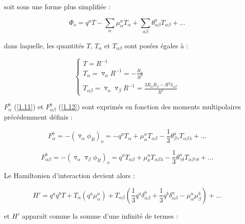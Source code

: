 	soit sous une forme plus simplifiée : 
	
	\begin{equation}
	\Phi_{o} = q^{a} T - \sum_{\alpha} \mu_{\alpha}^{a} T_{\alpha} + \sum_{\alpha\beta} \theta_{\alpha\beta}^{a} T_{\alpha\beta} + \ldots
	\end{equation}
	
        \noindent dans laquelle, les quantités $T$, $T_{\alpha}$ et $T_{\alpha\beta}$ sont posées égales à :
	
	\begin{equation}
	\begin{cases}
	T = R^{-1} \\
	T_{\alpha} = \triangledown_{\alpha} R^{-1} = - \frac{R_{\alpha}}{R^{3}}\\
	T_{\alpha\beta} = \triangledown_{\alpha} \triangledown_{\beta} R^{-1} = \frac{3R_{\alpha} R_{\beta}- R^{2}\delta_{\alpha\beta}}{R^{5}}
	\end{cases}
	\end{equation}
	
	$F_{\alpha}^{b}$ (\ref{1.11}) et $F_{\alpha\beta}^{b}$ (\ref{1.12}) sont exprimés en fonction des moments multipolaires \cite{buckingham1965general} précédemment définis : 
	
	\begin{equation}
	F_{\alpha}^{b} = -(\triangledown_{\alpha}\phi_{B})_{o} = -q^{a} T_{\alpha} + \mu_{\alpha}^{a} T_{\alpha\beta} - \frac{1}{3} \theta_{\beta\gamma}^{a} T_{\alpha\beta\lambda} + \ldots 
	\end{equation}
	
	\begin{equation}
	F_{\alpha\beta}^{b} = -(\triangledown_{\alpha} \triangledown_{\beta}\phi_{B})_{o} = q^{a} T_{\alpha\beta} + \mu_{\delta}^{a} T_{\alpha\beta\lambda} - \frac{1}{3} \theta_{\gamma\delta}^{a} T_{\alpha\beta\gamma\delta} + \ldots 
	\end{equation}
	
	Le Hamiltonien d'interaction devient alors : 
	
	\begin{equation}
	H' = q^{a} q^{b} T + T_{\alpha}(q^{a} \mu_{\alpha}^{a}) + T_{\alpha\beta} (\frac{1}{3}q^{a}\delta^{b}_{\alpha\beta}+ \frac{1}{3} q^{b}\delta^{a}_{\alpha\beta} - \mu_{\alpha}^{a}\mu_{\beta}^{b}) + \ldots  \label{1.19}
	\end{equation}
	
	\noindent et $H'$ apparaît comme la somme d'une infinité de termes : 
	
